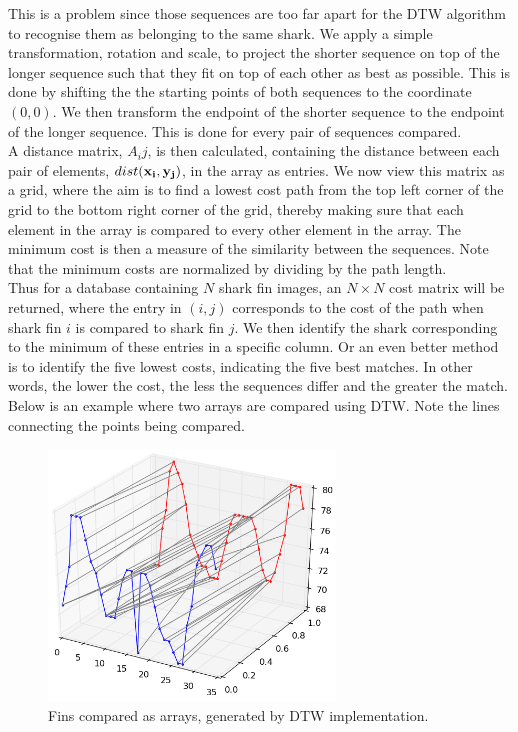 \documentclass[a4paper,10pt]{article}
\begin{document}
This is a problem since those sequences are too far apart for the DTW algorithm
to recognise them as belonging to the same shark.  We apply a simple
transformation, rotation and scale, to project the shorter sequence on top of the longer sequence such that they fit on top of each other
as best as possible.  This is done by shifting the the starting points
of both sequences to the coordinate $(0, 0)$.
We then transform the endpoint of the shorter sequence to the endpoint of the longer sequence.
This is done for every pair of sequences compared.  \\
 
A distance matrix, $A_ij$, is then calculated, containing the distance between
each pair of elements,  $dist(\bf{x}_i, \bf{y}_j)$, in the array as entries.
We now view this matrix as a
grid, where the
aim is to find a lowest cost path from the top left corner of the grid to the bottom right
corner of the grid, thereby making sure that each element in the array is compared to every other element in the array.
The minimum cost is then a measure of the similarity between the
sequences.  Note that the minimum costs are normalized by dividing by the path length. \\

Thus for a database containing $N$ shark fin images, an $N \times N$ cost
matrix will be returned, where the entry in $(i, j)$ corresponds to the cost
of the path when shark fin $i$ is compared to shark fin $j$.  We then identify the shark
corresponding to the minimum of these entries in a specific
column.  Or an even better method is to identify the five lowest costs, indicating the five best matches.  
In other words, the lower the cost, the less the sequences differ and the greater the match.  \\

Below is an example where two arrays are compared using DTW. Note the lines
connecting the points being compared.  

\begin{figure}[H]
 \centering
 \includegraphics[width=3in]{dtw.jpg}
 \caption{Fins compared as arrays, generated by DTW implementation.}
 \label{dtw}
\end{figure}
\end{document}
